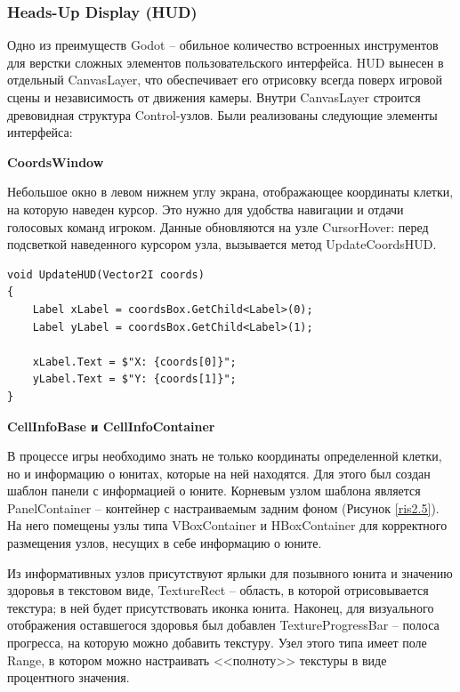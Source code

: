         
        \subsubsection{Heads-Up Display (HUD)}

            Одно из преимуществ Godot -- обильное количество встроенных инструментов для верстки сложных элементов пользовательского интерфейса. HUD вынесен в отдельный CanvasLayer, 
            что обеспечивает его отрисовку всегда поверх игровой сцены и независимость от движения камеры. Внутри CanvasLayer строится древовидная структура Control-узлов.
            Были реализованы следующие элементы интерфейса:

            \textbf{CoordsWindow}

            Небольшое окно в левом нижнем углу экрана, отображающее координаты клетки, на которую наведен курсор. Это нужно для удобства навигации и отдачи голосовых команд игроком.
            Данные обновляются на узле CursorHover: перед подсветкой наведенного курсором узла, вызывается метод UpdateCoordsHUD.
            \begin{lstlisting}[caption=обновление интерфейса]
void UpdateHUD(Vector2I coords)
{
    Label xLabel = coordsBox.GetChild<Label>(0);
    Label yLabel = coordsBox.GetChild<Label>(1);

    xLabel.Text = $"X: {coords[0]}";
    yLabel.Text = $"Y: {coords[1]}";
}
            \end{lstlisting}

            \textbf{CellInfoBase и CellInfoContainer}
            
            В процессе игры необходимо знать не только координаты определенной клетки, но и информацию о юнитах, которые на ней находятся. Для этого был создан шаблон
            панели с информацией о юните. Корневым узлом шаблона является PanelContainer -- контейнер с настраиваемым задним фоном (Рисунок \ref{ris2.5}). На него помещены узлы типа VBoxContainer и
            HBoxContainer для корректного размещения узлов, несущих в себе информацию о юните.

            Из информативных узлов присутствуют ярлыки для позывного юнита и значению здоровья в текстовом виде, TextureRect -- область, в которой отрисовывается текстура; в ней будет
            присутствовать иконка юнита. Наконец, для визуального отображения оставшегося здоровья был добавлен TextureProgressBar -- полоса прогресса, на которую можно добавить
            текстуру. Узел этого типа имеет поле Range, в котором можно настраивать <<полноту>> текстуры в виде процентного значения.

